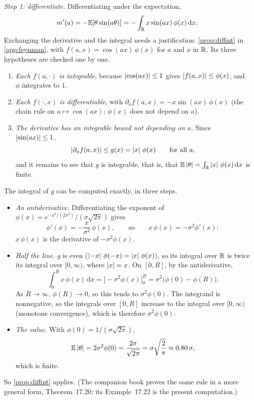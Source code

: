 \emph{Step 1: differentiate.} Differentiating under the expectation,
\[
  m'(a)=-\mathbb{E}[\theta\sin(a\theta)]=-\int_{\mathbb{R}} x\sin(ax)\,\phi(x)\,\mathrm dx .
\]
Exchanging the derivative and the integral needs a justification:
\cref{prop:diffint} in \cref{app:feynman}, with $f(a,x)=\cos(ax)\,\phi(x)$
for $a$ and $x$ in $\mathbb{R}$. Its three hypotheses are checked one by one.
\begin{enumerate}[nosep,label=(\arabic*)]
  \item \emph{Each $f(a,\cdot)$ is integrable}, because
        $\left\lvert \cos(ax)\right\rvert\le1$ gives $\left\lvert f(a,x)\right\rvert\le\phi(x)$, and $\phi$
        integrates to $1$.
  \item \emph{Each $f(\cdot,x)$ is differentiable}, with
        $\partial_af(a,x)=-x\sin(ax)\,\phi(x)$ (the chain rule on
        $a\mapsto\cos(ax)$; $\phi(x)$ does not depend on $a$).
  \item \emph{The derivative has an integrable bound not depending on
        $a$.} Since $\left\lvert \sin(ax)\right\rvert\le1$,
        \[
          \left\lvert \partial_af(a,x)\right\rvert\le g(x)=\left\lvert x\right\rvert\,\phi(x)\qquad
          \text{for all }a,
        \]
        and it remains to see that $g$ is integrable, that is, that
        $\mathbb{E}\left\lvert \theta\right\rvert=\int_{\mathbb{R}}\left\lvert x\right\rvert\,\phi(x)\,\mathrm dx$ is finite.
\end{enumerate}
The integral of $g$ can be computed exactly, in three steps.
\begin{itemize}[nosep]
  \item \emph{An antiderivative.} Differentiating the exponent of
        $\phi(x)=e^{-x^2/(2\sigma^2)}/(\sigma\sqrt{2\pi})$ gives
        \[
          \phi'(x)=-\frac{x}{\sigma^2}\,\phi(x),
          \qquad\text{so}\qquad
          x\,\phi(x)=-\sigma^2\phi'(x):
        \]
        $x\,\phi(x)$ is the derivative of $-\sigma^2\phi(x)$.
  \item \emph{Half the line.} $g$ is even ($\left\lvert -x\right\rvert\,\phi(-x)=\left\lvert x\right\rvert\,\phi(x)$), so its integral over $\mathbb{R}$ is twice its integral
        over $[0,\infty)$, where $\left\lvert x\right\rvert=x$. On $[0,R]$, by the
        antiderivative,
        \[
          \int_0^Rx\,\phi(x)\,\mathrm dx
          =\bigl[-\sigma^2\phi(x)\bigr]_0^R
          =\sigma^2\bigl(\phi(0)-\phi(R)\bigr).
        \]
        As $R\to\infty$, $\phi(R)\to0$, so this tends to
        $\sigma^2\phi(0)$. The integrand is nonnegative, so the
        integrals over $[0,R]$ increase to the integral over
        $[0,\infty)$ (monotone convergence), which is therefore
        $\sigma^2\phi(0)$.
  \item \emph{The value.} With $\phi(0)=1/(\sigma\sqrt{2\pi})$,
        \[
          \mathbb{E}\left\lvert \theta\right\rvert=2\sigma^2\phi(0)=\frac{2\sigma}{\sqrt{2\pi}}
          =\sigma\sqrt{\frac2\pi}\approx0.80\,\sigma ,
        \]
        which is finite.
\end{itemize}
So \cref{prop:diffint} applies. (The companion book proves the same
rule in a more general form, Theorem~17.20; its Example~17.22 is the
present computation.)

